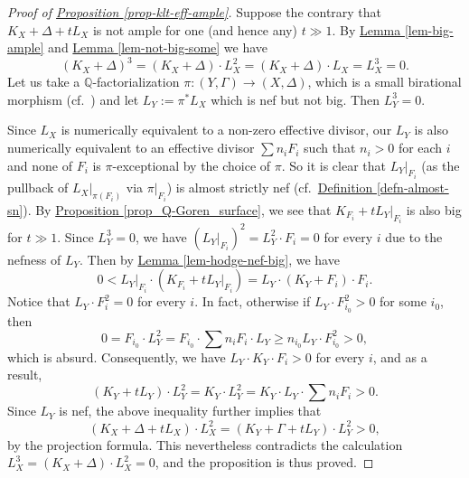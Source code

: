 \begin{proof}[Proof of {\hyperref[prop-klt-eff-ample]{Proposition \ref*{prop-klt-eff-ample}}}]
Suppose the contrary that $K_X+\Delta+tL_X$ is not ample for one (and hence any) $t\gg 1$.
By {\hyperref[lem-big-ample]{Lemma \ref*{lem-big-ample}}} and {\hyperref[lem-not-big-some]{Lemma \ref*{lem-not-big-some}}} we have 
\begin{equation}\label{eq_int-nb=0}
(K_X+\Delta)^3=(K_X+\Delta)\cdot L_X^2=(K_X+\Delta)\cdot L_X=L_X^3=0.
\end{equation}
Let us take a $\mathbb{Q}$-factorialization $\pi:(Y,\Gamma)\to (X,\Delta)$, which is a small birational morphism (cf.~\cite[Corollary 1.37, pp.~29-30]{Kollar13}) and let $L_Y:=\pi^*L_X$ which is  nef but not big. 
Then $L_Y^3=0$.

Since $L_X$ is numerically equivalent to a non-zero effective divisor, our $L_Y$ is also numerically equivalent to an effective divisor $\sum n_iF_i$ such that $n_i>0$ for each $i$ and none of $F_i$ is $\pi$-exceptional by the choice of $\pi$.
So it is clear that $L_Y|_{F_i}$ (as the pullback of $L_X|_{\pi(F_i)}$ via $\pi|_{F_i}$) is almost strictly nef (cf.~\hyperref[defn-almost-sn]{Definition \ref*{defn-almost-sn}}). 
By {\hyperref[prop_Q-Goren_surface]{Proposition \ref*{prop_Q-Goren_surface}}}, we see that   $K_{F_i}+tL_Y|_{F_i}$ is also big for $t\gg 1$. 
Since $L_Y^3=0$, we have $(L_Y|_{F_i})^2=L_Y^2\cdot F_i=0$ for every $i$ due to the nefness of $L_Y$. Then by {\hyperref[lem-hodge-nef-big]{Lemma \ref*{lem-hodge-nef-big}}}, we have
$$0<L_Y|_{F_i}\cdot (K_{F_i}+tL_Y|_{F_i})=L_Y\cdot (K_Y+F_i)\cdot F_i.$$
Notice that $L_Y\cdot F_i^2=0$ for every $i$. In fact, otherwise if $L_Y\cdot F_{i_0}^2>0$ for some $i_0$, then 
\[
0=F_{i_0}\cdot L_Y^2=F_{i_0}\cdot \sum n_iF_i\cdot L_Y\geqslant n_{i_0}L_Y\cdot F_{i_0}^2>0,
\]
which is absurd.
Consequently, we have $L_Y\cdot K_Y\cdot F_i>0$ for every $i$, 
and as a result,
$$(K_Y+tL_Y)\cdot L_Y^2=K_Y\cdot L_Y^2=K_Y\cdot L_Y\cdot \sum n_iF_i>0.$$
Since $L_Y$ is nef, the above inequality further implies that 
\[
(K_X+\Delta+tL_X)\cdot L_X^2=(K_Y+\Gamma+tL_Y)\cdot L_Y^2>0,
\]
by the projection formula. This nevertheless contradicts the calculation $L_X^3=(K_X+\Delta)\cdot L_X^2=0$, and the proposition is thus proved.
\end{proof}


